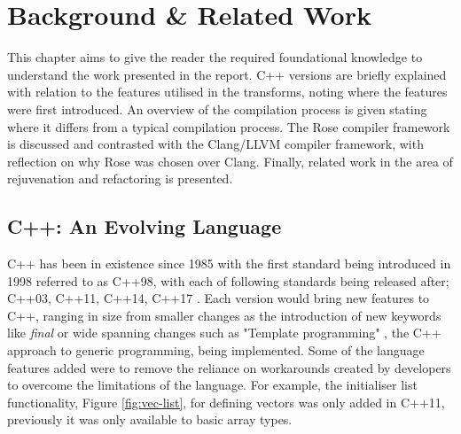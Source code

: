 \documentclass[bsc,frontabs,singlespacing,twoside,parskip,deptreport]{infthesis}
\begin{document}

\chapter{Background \& Related Work}

This chapter aims to give the reader the required foundational knowledge to understand the work presented in the report. C++ versions are briefly explained with relation to the features utilised in the transforms, noting where the features were first introduced. An overview of the compilation process is given stating where it differs from a typical compilation process. The Rose compiler framework is discussed and contrasted with the Clang/LLVM compiler framework, with reflection on why Rose was chosen over Clang. Finally, related work in the area of rejuvenation and refactoring is presented. 

\section{C++: An Evolving Language}\label{sec:cpp-background}
C++ has been in existence since 1985 with the first standard being introduced in 1998 referred to as C++98, with each of following standards being released after; C++03, C++11, C++14, C++17 \cite{CPP_VER}. Each version would bring new features to C++, ranging in size from smaller changes as the introduction of new keywords like \textit{final} or wide spanning changes such as "Template programming" \cite{TEMP_CPP}, the C++ approach to generic programming, being implemented. Some of the language features added were to remove the reliance on workarounds \cite{WORKARROUND_CPP} created by developers to overcome the limitations of the language. For example, the initialiser list functionality, Figure \ref{fig:vec-list}, for defining vectors was only added in C++11, previously it was only available to basic array types. 
\end{document}
